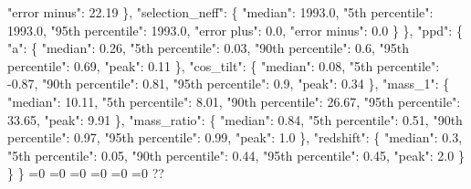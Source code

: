 {{          "error minus": 22.19%
        \}, %
        "selection\_neff": \{%
          "median": 1993.0, %
          "5th percentile": 1993.0, %
          "95th percentile": 1993.0, %
          "error plus": 0.0, %
          "error minus": 0.0%
        \}%
      \}, %
      "ppd": \{%
        "a": \{%
          "median": 0.26, %
          "5th percentile": 0.03, %
          "90th percentile": 0.6, %
          "95th percentile": 0.69, %
          "peak": 0.11%
        \}, %
        "cos\_tilt": \{%
          "median": 0.08, %
          "5th percentile": {-}0.87, %
          "90th percentile": 0.81, %
          "95th percentile": 0.9, %
          "peak": 0.34%
        \}, %
        "mass\_1": \{%
          "median": 10.11, %
          "5th percentile": 8.01, %
          "90th percentile": 26.67, %
          "95th percentile": 33.65, %
          "peak": 9.91%
        \}, %
        "mass\_ratio": \{%
          "median": 0.84, %
          "5th percentile": 0.51, %
          "90th percentile": 0.97, %
          "95th percentile": 0.99, %
          "peak": 1.0%
        \}, %
        "redshift": \{%
          "median": 0.3, %
          "5th percentile": 0.05, %
          "90th percentile": 0.44, %
          "95th percentile": 0.45, %
          "peak": 2.0%
        \}%
      \}%
    \}}%
  \else%
    \ifnum{}=0%
      \def\MagBetaConstrainedIidTiltIsotropicTruncnormNid@out{%
    {-}1034.25}%
    \else%
      \ifnum{}=0%
      \def\MagBetaConstrainedIidTiltIsotropicTruncnormNid@out{%
    0.24}%
    \else%
      \ifnum{}=0%
      \def\MagBetaConstrainedIidTiltIsotropicTruncnormNid@out{%
    {-}1.95}%
    \else%
      \ifnum{}=0%
      \def\MagBetaConstrainedIidTiltIsotropicTruncnormNid@out{%
    {-}1.31}%
    \else%
      \ifnum{}=0%
      \let\MagBetaConstrainedIidTiltIsotropicTruncnormNid@out\MagBetaConstrainedIidTiltIsotropicTruncnormNid@I%
    \else%
      \ifnum{}=0%
      \let\MagBetaConstrainedIidTiltIsotropicTruncnormNid@out\MagBetaConstrainedIidTiltIsotropicTruncnormNid@II%
    \else%
      \def\MagBetaConstrainedIidTiltIsotropicTruncnormNid@out{%
    ??}%
    \fi\fi\fi\fi\fi\fi
  \fi
  \MagBetaConstrainedIidTiltIsotropicTruncnormNid@out
}\newcommand\MagBetaConstrainedIidTiltIsotropicTruncnormNid@I[1][all]{%
  \ifnum\pdfstrcmp{#1}{all}=0%
    \def\MagBetaConstrainedIidTiltIsotropicTruncnormNid@I@out{%
    \{%
      "alpha\_1": \{%
        "median": 1.85, %
        "5th percentile": {-}0.04, %
}}
